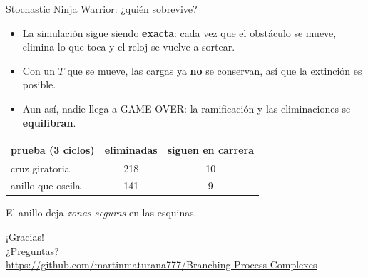\documentclass[aspectratio=169,11pt]{beamer}
\begin{document}
\begin{frame}{Stochastic Ninja Warrior: ¿quién sobrevive?}
  \begin{itemize}
    \item La simulación sigue siendo \textbf{exacta}: cada vez que el obstáculo se mueve, elimina lo que toca y el reloj se vuelve a sortear.
    \item Con un $T$ que se mueve, las cargas ya \textbf{no} se conservan, así que la extinción es posible.
    \item Aun así, nadie llega a GAME OVER: la ramificación y las eliminaciones se \textbf{equilibran}.
  \end{itemize}
  \vspace{2mm}
  \begin{center}
    \begin{tabular}{@{}lcc@{}}
      \toprule
      prueba (3 ciclos) & eliminadas & siguen en carrera \\
      \midrule
      cruz giratoria & 218 & 10 \\
      anillo que oscila & 141 & 9 \\
      \bottomrule
    \end{tabular}
  \end{center}
  {\small El anillo deja \emph{zonas seguras} en las esquinas.}
\end{frame}

\begin{frame}[standout]
  ¡Gracias!\\[4mm]
  {\normalsize ¿Preguntas?}\\[6mm]
  {\footnotesize \url{https://github.com/martinmaturana777/Branching-Process-Complexes}}
\end{frame}
\end{document}
